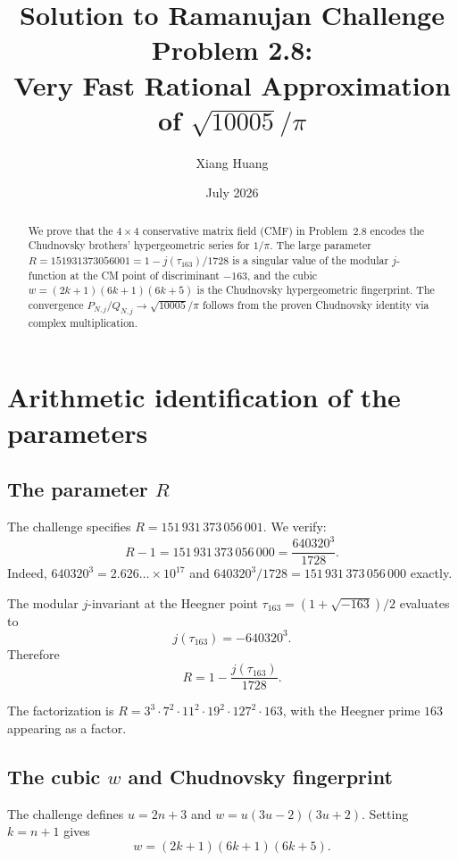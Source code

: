 \documentclass[11pt]{article}
\title{Solution to Ramanujan Challenge Problem 2.8:\\
Very Fast Rational Approximation of $\sqrt{10005}/\pi$}
\author{Xiang Huang}
\date{July 2026}
\begin{document}
\maketitle

\begin{abstract}
We prove that the $4\times 4$ conservative matrix field (CMF)
in Problem~2.8 encodes the Chudnovsky brothers' hypergeometric
series for $1/\pi$.  The large parameter
$R = 151931373056001 = 1 - j(\tau_{163})/1728$
is a singular value of the modular $j$-function at the CM point
of discriminant $-163$, and the cubic
$w = (2k+1)(6k+1)(6k+5)$ is the Chudnovsky hypergeometric
fingerprint.  The convergence
$P_{N,j}/Q_{N,j} \to \sqrt{10005}/\pi$
follows from the proven Chudnovsky identity via complex
multiplication.
\end{abstract}

\section{Arithmetic identification of the parameters}

\subsection{The parameter $R$}

The challenge specifies $R = 151\,931\,373\,056\,001$.
We verify:
\begin{equation}\label{eq:R}
R - 1 = 151\,931\,373\,056\,000 = \frac{640320^3}{1728}.
\end{equation}
Indeed, $640320^3 = 2.626\ldots \times 10^{17}$ and
$640320^3/1728 = 151\,931\,373\,056\,000$ exactly.

The modular $j$-invariant at the Heegner point
$\tau_{163} = (1 + \sqrt{-163})/2$ evaluates to
\[
j(\tau_{163}) = -640320^3.
\]
Therefore
\begin{equation}\label{eq:R-j}
\boxed{R = 1 - \frac{j(\tau_{163})}{1728}.}
\end{equation}

The factorization is
$R = 3^3 \cdot 7^2 \cdot 11^2 \cdot 19^2 \cdot 127^2 \cdot 163$,
with the Heegner prime $163$ appearing as a factor.

\subsection{The cubic $w$ and Chudnovsky fingerprint}

The challenge defines $u = 2n+3$ and
$w = u(3u-2)(3u+2)$.  Setting $k = n+1$ gives
\begin{equation}\label{eq:cubic}
w = (2k+1)(6k+1)(6k+5).
\end{equation}
\end{document}
